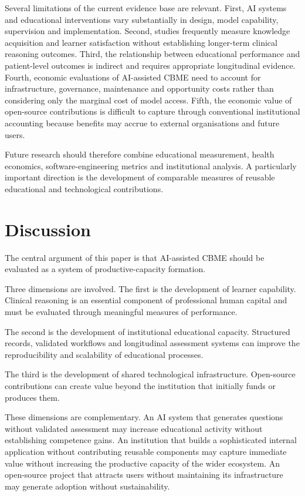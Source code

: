 \documentclass[11pt,a4paper]{article}
\begin{document}
Several limitations of the current evidence base are relevant. First, AI systems and educational interventions vary substantially in design, model capability, supervision and implementation. Second, studies frequently measure knowledge acquisition and learner satisfaction without establishing longer-term clinical reasoning outcomes. Third, the relationship between educational performance and patient-level outcomes is indirect and requires appropriate longitudinal evidence. Fourth, economic evaluations of AI-assisted CBME need to account for infrastructure, governance, maintenance and opportunity costs rather than considering only the marginal cost of model access. Fifth, the economic value of open-source contributions is difficult to capture through conventional institutional accounting because benefits may accrue to external organisations and future users.

Future research should therefore combine educational measurement, health economics, software-engineering metrics and institutional analysis. A particularly important direction is the development of comparable measures of reusable educational and technological contributions.

\section{Discussion}
The central argument of this paper is that AI-assisted CBME should be evaluated as a system of productive-capacity formation.

Three dimensions are involved. The first is the development of learner capability. Clinical reasoning is an essential component of professional human capital and must be evaluated through meaningful measures of performance.

The second is the development of institutional educational capacity. Structured records, validated workflows and longitudinal assessment systems can improve the reproducibility and scalability of educational processes.

The third is the development of shared technological infrastructure. Open-source contributions can create value beyond the institution that initially funds or produces them.

These dimensions are complementary. An AI system that generates questions without validated assessment may increase educational activity without establishing competence gains. An institution that builds a sophisticated internal application without contributing reusable components may capture immediate value without increasing the productive capacity of the wider ecosystem. An open-source project that attracts users without maintaining its infrastructure may generate adoption without sustainability.
\end{document}
